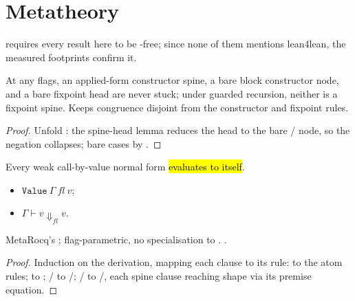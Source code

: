 \section{Metatheory}
\label{sec:lambdabox:metatheory}

 requires every result here to be -free; since none of them mentions lean4lean, the measured footprints confirm it.

\begin{lemma}
\label{lem:isStuckApp_construct_spine}
\leanok
{}
 At any flags, an applied-form constructor spine, a bare block constructor node, and a bare fixpoint head are never stuck; under guarded recursion, neither is a fixpoint spine. Keeps congruence disjoint from the constructor and fixpoint rules.
\end{lemma}
\begin{proof}
\leanok
{}
 Unfold : the spine-head lemma reduces the head to the bare / node, so the negation collapses; bare cases by .
\end{proof}

\begin{theorem}
\label{thm:value_final}
\leanok
{}
 Every weak call-by-value normal form \hl{evaluates to itself}.
\begin{itemize}
\item {} $\mathtt{Value}\ \Gamma\ fl\ v$;
\item {} $\Gamma \vdash v \Downarrow_{fl} v$.
\end{itemize}
 MetaRocq's ; flag-parametric, no specialisation to .
 \stProved{}.
\end{theorem}
\begin{proof}
\leanok
{}
 Induction on the  derivation, mapping each clause to its rule:  to the atom rules;  to ; / to /; / to /, each spine clause reaching  shape via its premise equation.
\end{proof}

